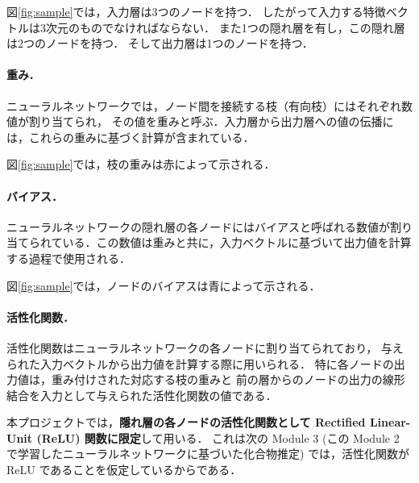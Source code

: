 \documentclass[11pt, titlepage, dvipdfmx, twoside]{jarticle}
\newcommand{\figref}[1]{図\ref{fig:#1}}
\begin{document}
\figref{sample}では，入力層は3つのノードを持つ．
したがって入力する特徴ベクトルは3次元のものでなければならない．
また1つの隠れ層を有し，この隠れ層は2つのノードを持つ．
そして出力層は1つのノードを持つ．

\paragraph{重み．}
ニューラルネットワークでは，ノード間を接続する枝（有向枝）にはそれぞれ数値が割り当てられ，
その値を重みと呼ぶ．入力層から出力層への値の伝播には，これらの重みに基づく計算が含まれている．

\figref{sample}では，枝の重みは赤によって示される．


\paragraph{バイアス．}
ニューラルネットワークの隠れ層の各ノードにはバイアスと呼ばれる数値が割り当てられている．この数値は重みと共に，入力ベクトルに基づいて出力値を計算する過程で使用される．

\figref{sample}では，ノードのバイアスは青によって示される．

\paragraph{活性化関数．}
活性化関数はニューラルネットワークの各ノードに割り当てられており，
与えられた入力ベクトルから出力値を計算する際に用いられる．
特に各ノードの出力値は，重み付けされた対応する枝の重みと
前の層からのノードの出力の線形結合を入力として与えられた活性化関数の値である．

本プロジェクトでは，{\bf 隱れ層の各ノードの活性化関数として
Rectified Linear-Unit (ReLU) 関数に限定}して用いる．
これは次の Module 3 (この Module 2 で学習したニューラルネットワークに基づいた化合物推定)
では，活性化関数が ReLU であることを仮定しているからである． 

\medskip

\end{document}
